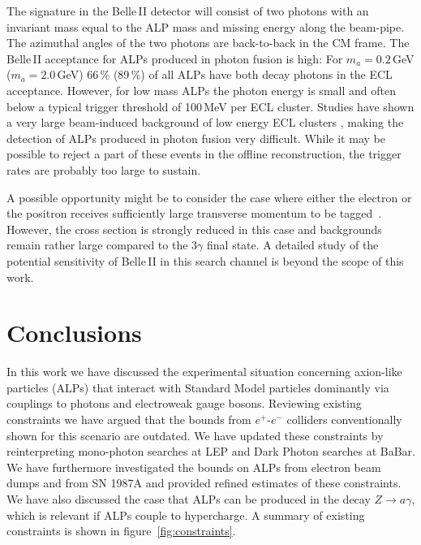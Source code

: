 \documentclass[11pt,a4paper]{article}
\def \belletwo {Belle\,II\xspace}
\def \babar {BaBar\xspace}
\begin{document}
The signature in the \belletwo detector will consist of two photons with an invariant mass equal to the ALP mass and missing energy along the beam-pipe. The azimuthal angles of the two photons are back-to-back in the CM frame. The \belletwo acceptance for ALPs produced in photon fusion is high: For $m_a=0.2$\,GeV ($m_a=2.0$\,GeV) 66\,\% (89\,\%) of all ALPs have both decay photons in the ECL acceptance. However, for low mass ALPs the photon energy is small and often below a typical trigger threshold of 100\,MeV per ECL cluster. Studies have shown a very large beam-induced background of low energy ECL clusters \cite{lit:b2tip}, making the detection of ALPs produced in photon fusion very difficult. While it may be possible to reject a part of these events in the offline reconstruction, the trigger rates are probably too large to sustain. 

A possible opportunity might be to consider the case where either the electron or the positron receives sufficiently large transverse momentum to be tagged~\cite{Izaguirre:2016dfi}. However, the cross section is strongly reduced in this case and backgrounds remain rather large compared to the $3\gamma$ final state. A detailed study of the potential sensitivity of \belletwo in this search channel is beyond the scope of this work. 

\section{Conclusions}
\label{sec:conclusions}

In this work we have discussed the experimental situation concerning axion-like particles (ALPs) that interact with Standard Model particles dominantly via couplings to photons and electroweak gauge bosons. Reviewing existing constraints we have argued that the bounds from $e^+$-$e^-$ colliders conventionally shown for this scenario are outdated. We have updated these constraints by reinterpreting mono-photon searches at LEP and Dark Photon searches at \babar. We have furthermore investigated the bounds on ALPs from electron beam dumps and from SN 1987A and provided refined estimates of these constraints. We have also discussed the case that ALPs can be produced in the decay $Z \to a \gamma$, which is relevant if ALPs couple to hypercharge. A summary of existing constraints is shown in figure~\ref{fig:constraints}.
\end{document}
